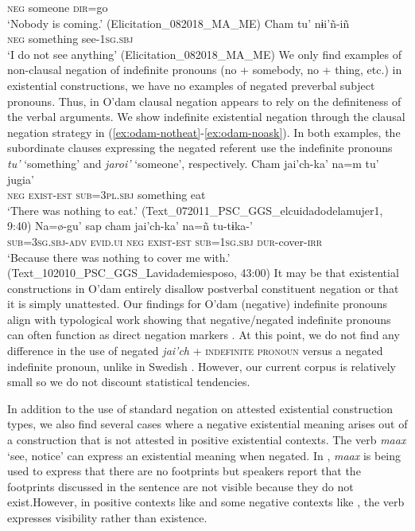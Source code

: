 \documentclass[output=paper]{langsci/langscibook}
\begin{document}
\textsc{neg}	someone	\textsc{dir}=go\\
\glt ‘Nobody is coming.’ (Elicitation\_082018\_MA\_ME)
\z 
\ea
\label{ex:odam-seeanything}
\gll Cham 	tu’ 		nɨi’ñ-iñ\\
\textsc{neg}	something	see-1\textsc{sg.sbj}\\
\glt ‘I do not see anything’ (Elicitation\_082018\_MA\_ME)
\z 
We only find examples of non-clausal negation of indefinite pronouns (no + somebody, no + thing, etc.) in existential constructions, we have no examples of negated preverbal subject pronouns. Thus, in O'dam clausal negation appears to rely on the definiteness of the verbal arguments. We show indefinite existential negation through the clausal negation strategy in (\ref{ex:odam-notheat}-\ref{ex:odam-noask}). In both examples, the subordinate clauses expressing the negated referent use the indefinite pronouns \emph{tu’} ‘something’ and \emph{jaroi’} ‘someone’, respectively.
\ea
\label{ex:odam-notheat}
\gll Cham 	jai’ch-ka’ 	na=m 			tu’ 		jugia’\\
\textsc{neg} 	\textsc{exist-est} 	\textsc{sub=3pl.sbj} 	something 	eat\\
\glt ‘There was nothing to eat.’ (Text\_072011\_PSC\_GGS\_elcuidadodelamujer1, 9:40)
\z 
\ea
\label{ex:odam-noask}
\gll Na=\o-gu' sap cham jai'ch-ka' na=ñ tu-tɨka-'\\
\textsc{sub=3sg.sbj-adv} \textsc{evid.ui} \textsc{neg} \textsc{exist-est} \textsc{sub=1sg.sbj} \textsc{dur-}cover-\textsc{irr}\\
\glt ‘Because there was nothing to cover me with.’ (Text\_102010\_PSC\_GGS\_Lavidademiesposo, 43:00)
\z 
It may be that existential constructions in O’dam entirely disallow postverbal constituent negation or that it is simply unattested. Our findings for O'dam (negative) indefinite pronouns align with typological work showing that negative/negated indefinite pronouns can often function as direct negation markers \citep{Haspelmath1997,Veselinova2013,Alsenoy2016}. At this point, we do not find any difference in the use of negated \emph{jai'ch} + \textsc{indefinite pronoun} versus a negated indefinite pronoun, unlike in Swedish \citep{Bordal2017}. However, our current corpus is relatively small so we do not discount statistical tendencies.

In addition to the use of standard negation on attested existential construction types, we also find several cases where a negative existential meaning arises out of a construction that is not attested in positive existential contexts. The verb \emph{maax} ‘see, notice’ can express an existential meaning when negated. In , \emph{maax} is being used to express that there are no footprints but speakers report that the footprints discussed in the sentence are not visible because they do not exist.\footnotemark However, in positive contexts like  and some negative contexts like , the verb expresses visibility rather than existence.
\end{document}
